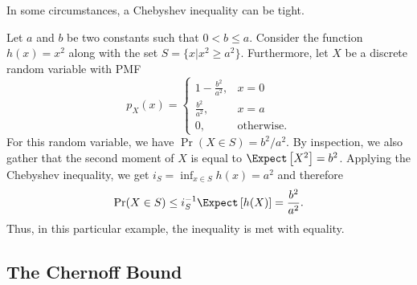 In some circumstances, a Chebyshev inequality can be tight.

\begin{example}
Let $a$ and $b$ be two constants such that $0 < b \leq a$.
Consider the function $h(x) = x^2$ along with the set $S = \{ x | x^2 \geq a^2 \}$.
Furthermore, let $X$ be a discrete random variable with PMF
\begin{equation*}
p_X (x) = \begin{cases} 1 - \frac{b^2}{a^2}, & x = 0 \\
\frac{b^2}{a^2}, & x = a \\
0, & \text{otherwise}. \end{cases}
\end{equation*}
For this random variable, we have $\Pr (X \in S) = b^2/a^2$.
By inspection, we also gather that the second moment of $X$ is equal to $\Expect \left[ X^2 \right] = b^2$.
Applying the Chebyshev inequality, we get $i_S = \inf_{x \in S} h(x) = a^2$ and therefore
\begin{equation*}
\Pr (X \in S) \leq i_S^{-1} \Expect \left[ h(X) \right]
= \frac{b^2}{a^2} .
\end{equation*}
Thus, in this particular example, the inequality is met with equality.
\end{example}


\subsection{The Chernoff Bound}

